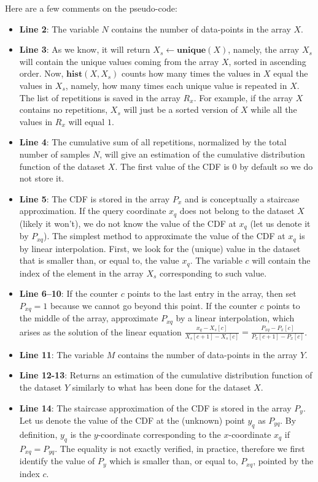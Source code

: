 \documentclass[10pt,final]{siamltex}
\begin{document}
{{Here are a few comments on the pseudo-code:
%
\begin{itemize}
\item \textbf{Line 2}: The variable $N$ contains the number of data-points in the array $X$.
\item \textbf{Line 3}: As we know, it will return $X_s \gets \mathbf{unique}(X)$, namely, the array $X_s$ will contain the unique values coming from the array $X$, sorted in ascending order. Now, $\mathbf{hist}(X,X_s)$ counts how many times the values in $X$ equal the values in $X_s$, namely, how many times each unique value is repeated in $X$. The list of repetitions is saved in the array $R_x$. For example, if the array $X$ contains no repetitions, $X_s$ will just be a sorted version of $X$ while all the values in $R_x$ will equal $1$.
\item \textbf{Line 4}: The cumulative sum of all repetitions, normalized by the total number of samples $N$, will give an estimation of the cumulative distribution function of the dataset $X$. The first value of the CDF is $0$ by default so we do not store it.
\item \textbf{Line 5}: The CDF is stored in the array $P_x$ and is conceptually a staircase approximation. If the query coordinate $x_q$ does not belong to the dataset $X$ (likely it won't), we do not know the value of the CDF at $x_q$ (let us denote it by $P_{xq}$). The simplest method to approximate the value of the CDF at $x_q$ is by linear interpolation. First, we look for the (unique) value in the dataset that is smaller than, or equal to, the value $x_q$. The variable $c$ will contain the index of the element in the array $X_s$ corresponding to such value.
\item \textbf{Line 6--10}: If the counter $c$ points to the last entry in the array, then set $P_{xq}=1$ because we cannot go beyond this point. If the counter $c$ points to the middle of the array, approximate $P_{xq}$ by a linear interpolation, which arises as the solution of the linear equation $\tfrac{x_q-X_s[c]}{X_s[c+1]-X_s[c]}=\tfrac{P_{xq}-P_x[c]}{P_x[c+1]-P_x[c]}$.
\item \textbf{Line 11}: The variable $M$ contains the number of data-points in the array $Y$.
\item \textbf{Line 12-13}: Returns an estimation of the cumulative distribution function of the dataset $Y$ similarly to what has been done for the dataset $X$.
\item \textbf{Line 14}: The staircase approximation of the CDF is stored in the array $P_y$. Let us denote the value of the CDF at the (unknown) point $y_q$ as $P_{yq}$. By definition, $y_q$ is the $y$-coordinate corresponding to the $x$-coordinate $x_q$ if $P_{xq} = P_{yq}$. The equality is not exactly verified, in practice, therefore we first identify the value of $P_y$ which is smaller than, or equal to, $P_{xq}$, pointed by the index $c$.

\end{itemize}}}
\end{document}
